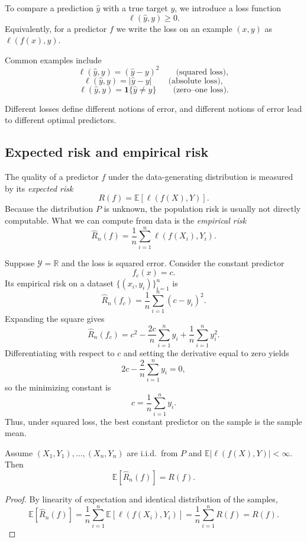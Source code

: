 To compare a prediction $\hat y$ with a true target $y$, we introduce a loss function
\[
\ell(\hat y,y)\ge 0.
\]
Equivalently, for a predictor $f$ we write the loss on an example $(x,y)$ as $\ell(f(x),y)$.

Common examples include
\[
\ell(\hat y,y)=(\hat y-y)^2
\qquad\text{(squared loss)},
\]
\[
\ell(\hat y,y)=|\hat y-y|
\qquad\text{(absolute loss)},
\]
\[
\ell(\hat y,y)=\mathbf 1\{\hat y\neq y\}
\qquad\text{(zero--one loss)}.
\]

Different losses define different notions of error, and different notions of error lead to different optimal predictors.

\subsection*{Expected risk and empirical risk}

The quality of a predictor $f$ under the data-generating distribution is measured by its \emph{expected risk}
\[
R(f)=\mathbb E[\ell(f(X),Y)].
\]
Because the distribution $P$ is unknown, the population risk is usually not directly computable. What we can compute from data is the \emph{empirical risk}
\[
\widehat R_n(f)=\frac1n\sum_{i=1}^n \ell(f(X_i),Y_i).
\]

\begin{example}
Suppose $\mathcal Y=\mathbb R$ and the loss is squared error. Consider the constant predictor
\[
f_c(x)=c.
\]
Its empirical risk on a dataset $\{(x_i,y_i)\}_{i=1}^n$ is
\[
\widehat R_n(f_c)=\frac1n\sum_{i=1}^n (c-y_i)^2.
\]
Expanding the square gives
\[
\widehat R_n(f_c)=c^2-\frac{2c}{n}\sum_{i=1}^n y_i+\frac1n\sum_{i=1}^n y_i^2.
\]
Differentiating with respect to $c$ and setting the derivative equal to zero yields
\[
2c-\frac{2}{n}\sum_{i=1}^n y_i=0,
\]
so the minimizing constant is
\[
c=\frac1n\sum_{i=1}^n y_i.
\]
Thus, under squared loss, the best constant predictor on the sample is the sample mean.
\end{example}

\begin{proposition}
Assume $(X_1,Y_1),\dots,(X_n,Y_n)$ are i.i.d.\ from $P$ and $\mathbb E|\ell(f(X),Y)|<\infty$. Then
\[
\mathbb E[\widehat R_n(f)] = R(f).
\]
\end{proposition}

\begin{proof}
By linearity of expectation and identical distribution of the samples,
\[
\mathbb E[\widehat R_n(f)]
=
\frac1n\sum_{i=1}^n \mathbb E[\ell(f(X_i),Y_i)]
=
\frac1n\sum_{i=1}^n R(f)
=
R(f).
\]
\end{proof}


